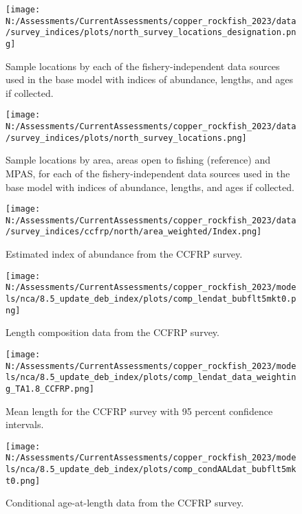\documentclass[11pt,
  english,
  letterpaper,
]{article}
\begin{document}
\begin{figure}
\centering
\texttt{[image: N:/Assessments/CurrentAssessments/copper\_rockfish\_2023/data/survey\_indices/plots/north\_survey\_locations\_designation.png]}
\caption{Sample locations by each of the fishery-independent data sources used in the base model with indices of abundance, lengths, and ages if collected.\label{fig:survey-locations}}
\end{figure}

\begin{figure}
\centering
\texttt{[image: N:/Assessments/CurrentAssessments/copper\_rockfish\_2023/data/survey\_indices/plots/north\_survey\_locations.png]}
\caption{Sample locations by area, areas open to fishing (reference) and MPAS, for each of the fishery-independent data sources used in the base model with indices of abundance, lengths, and ages if collected.\label{fig:ref-mpa}}
\end{figure}

\begin{figure}
\centering
\texttt{[image: N:/Assessments/CurrentAssessments/copper\_rockfish\_2023/data/survey\_indices/ccfrp/north/area\_weighted/Index.png]}
\caption{Estimated index of abundance from the CCFRP survey.\label{fig:ccfrp-index-main}}
\end{figure}

\begin{figure}
\centering
\texttt{[image: N:/Assessments/CurrentAssessments/copper\_rockfish\_2023/models/nca/8.5\_update\_deb\_index/plots/comp\_lendat\_bubflt5mkt0.png]}
\caption{Length composition data from the CCFRP survey.\label{fig:ccfrp-len-data}}
\end{figure}

\begin{figure}
\centering
\texttt{[image: N:/Assessments/CurrentAssessments/copper\_rockfish\_2023/models/nca/8.5\_update\_deb\_index/plots/comp\_lendat\_data\_weighting\_TA1.8\_CCFRP.png]}
\caption{Mean length for the CCFRP survey with 95 percent confidence intervals.\label{fig:ccfrp-mean-len-data}}
\end{figure}

\begin{figure}
\centering
\texttt{[image: N:/Assessments/CurrentAssessments/copper\_rockfish\_2023/models/nca/8.5\_update\_deb\_index/plots/comp\_condAALdat\_bubflt5mkt0.png]}
\caption{Conditional age-at-length data from the CCFRP survey.\label{fig:ccfrp-age-data}}
\end{figure}
\end{document}

